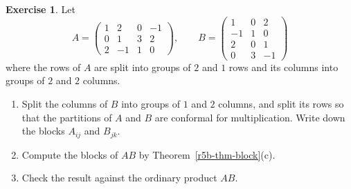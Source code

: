 \documentclass[12pt]{article}
\theoremstyle{definition}
\newtheorem{exercise}{Exercise}
\begin{document}
\begin{exercise}\label{r5b-dr-block-product}
Let
\[
A=\left(\begin{array}{cc|cc}1&2&0&-1\\0&1&3&2\\\hline2&-1&1&0\end{array}\right),\qquad
B=\begin{pmatrix}1&0&2\\-1&1&0\\2&0&1\\0&3&-1\end{pmatrix}
\]
where the rows of \(A\) are split into groups of \(2\) and \(1\) rows and its columns into groups of \(2\) and \(2\)
columns.
\begin{enumerate}
\item Split the columns of \(B\) into groups of \(1\) and \(2\) columns, and split its rows so that the partitions of
\(A\) and \(B\) are conformal for multiplication. Write down the blocks \(A_{ij}\) and \(B_{jk}\).
\item Compute the blocks of \(AB\) by Theorem~\ref{r5b-thm-block}(c).
\item Check the result against the ordinary product \(AB\).
\end{enumerate}
\end{exercise}
\end{document}
